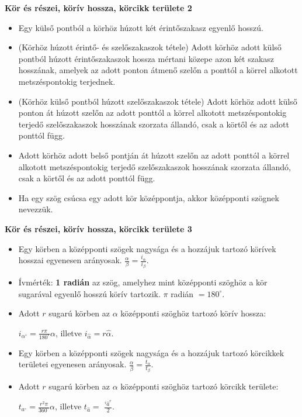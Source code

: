 \documentclass[11pt]{beamer}
\begin{document}
\begin{frame}[<+->]
\begin{block}{\textbf{Kör és részei, körív hossza, körcikk területe 2}}
\begin{itemize}[label=$\circ$]
\item Egy külső pontból a körhöz húzott két érintőszakasz egyenlő hosszú.
\item (Körhöz húzott érintő- és szelőszakaszok tétele) Adott körhöz adott külső pontból húzott érintőszakaszok hossza mértani közepe azon két szakasz hosszának, amelyek az adott ponton átmenő szelőn a ponttól a körrel alkotott metszéspontokig terjednek.
\item (Körhöz külső pontból húzott szelőszakaszok tétele) Adott körhöz adott külső ponton át húzott szelőn az adott ponttól a körrel alkotott metszéspontokig terjedő szelőszakaszok hosszának szorzata állandó, csak a körtől és az adott ponttól függ.
\item Adott körhöz adott belső pontján át húzott szelőn az adott ponttól a körrel alkotott metszéspontokig terjedő szelőszakaszok hosszának szorzata állandó, csak a körtől és az adott ponttól függ.
\item Ha egy szög csúcsa egy adott kör középpontja, akkor középponti szögnek nevezzük.
\end{itemize}
\end{block}
\end{frame}

\begin{frame}[<+->]
\begin{block}{\textbf{Kör és részei, körív hossza, körcikk területe 3}}
\begin{itemize}[label=$\circ$]
\item Egy körben a középponti szögek nagysága és a hozzájuk tartozó körívek hosszai egyenesen arányosak. $\frac{\alpha}{\beta} = \frac{i_\alpha}{i_\beta}$.
\item Ívmérték: \textbf{1 radián} az szög, amelyhez mint középponti szöghöz a kör sugarával egyenlő hosszú körív tartozik. $\pi$ radián $= 180^\circ$.
\item Adott $r$ sugarú körben az $\alpha$ középponti szöghöz tartozó körív hossza:
\begin{center}
$i_{\alpha^\circ} = \frac{r\pi}{180^\circ}\alpha$, illetve $i_{\hat{\alpha}} = r\hat{\alpha}$.
\end{center}
\item Egy körben a középponti szögek nagysága és a hozzájuk tartozó körcikkek területei egyenesen arányosak. $ \frac{\alpha}{\beta} = \frac{t_\alpha}{t_\beta}$.
\item Adott $r$ sugarú körben az $\alpha$ középponti szöghöz tartozó körcikk területe:
\begin{center}
$t_{a^\circ} = \frac{r^2\pi}{360^\circ}\alpha$, illetve $t_{\hat{a}}=$  $\frac{^i\hat{a}^r}{2}$.
\end{center}
\end{itemize}
\end{block}
\end{frame}
\end{document}
